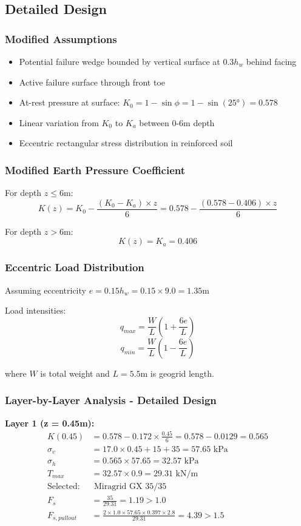 \documentclass[10pt,a4paper,twocolumn]{article}
\begin{document}
\subsection{Detailed Design}

\subsubsection{Modified Assumptions}
\begin{itemize}
\item Potential failure wedge bounded by vertical surface at 0.3$h_w$ behind facing
\item Active failure surface through front toe
\item At-rest pressure at surface: $K_0 = 1 - \sin\phi = 1 - \sin(25°) = 0.578$
\item Linear variation from $K_0$ to $K_a$ between 0-6m depth
\item Eccentric rectangular stress distribution in reinforced soil
\end{itemize}

\subsubsection{Modified Earth Pressure Coefficient}
For depth $z \leq 6$m:
$$K(z) = K_0 - \frac{(K_0 - K_a) \times z}{6} = 0.578 - \frac{(0.578 - 0.406) \times z}{6}$$

For depth $z > 6$m:
$$K(z) = K_a = 0.406$$

\subsubsection{Eccentric Load Distribution}
Assuming eccentricity $e = 0.15h_w = 0.15 \times 9.0 = 1.35$m

Load intensities:
$$q_{max} = \frac{W}{L}(1 + \frac{6e}{L})$$
$$q_{min} = \frac{W}{L}(1 - \frac{6e}{L})$$

where $W$ is total weight and $L = 5.5$m is geogrid length.
\subsubsection{Layer-by-Layer Analysis - Detailed Design}

\textbf{Layer 1 (z = 0.45m):}
\begin{align}
K(0.45) &= 0.578 - 0.172 \times \frac{0.45}{6} = 0.578 - 0.0129 = 0.565 \\
\sigma_v &= 17.0 \times 0.45 + 15 + 35 = 57.65 \text{ kPa} \\
\sigma_h &= 0.565 \times 57.65 = 32.57 \text{ kPa} \\
T_{max} &= 32.57 \times 0.9 = 29.31 \text{ kN/m} \\
\text{Selected:} &\text{ Miragrid GX 35/35} \\
F_s &= \frac{35}{29.31} = 1.19 > 1.0 \\
F_{s,pullout} &= \frac{2 \times 1.0 \times 57.65 \times 0.397 \times 2.8}{29.31} = 4.39 > 1.5
\end{align}
\end{document}
